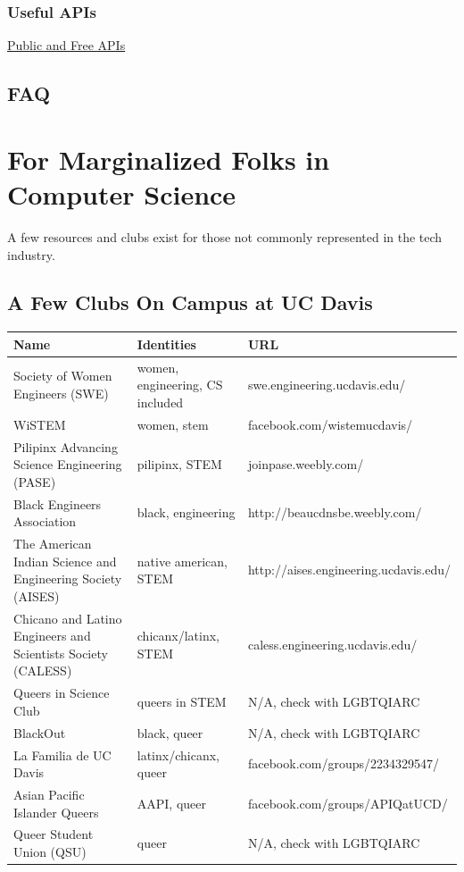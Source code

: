 \documentclass{article}
\begin{document}
\subsubsection{Useful APIs}
\href{https://github.com/toddmotto/public-apis}{Public and Free APIs}
\subsection{FAQ}
\newpage
\section {For Marginalized Folks in Computer Science}
\hspace{0.5cm} A few resources and clubs exist for those not commonly represented in the tech industry. 

\subsection{A Few Clubs On Campus at UC Davis}
\begin{tabular}{|p{5cm}|l|p{7cm}|}
\hline
\textbf{Name} & \textbf{Identities} & \textbf{URL} \\
\hline
Society of Women Engineers (SWE) & women, engineering, CS included & swe.engineering.ucdavis.edu/ \\
\hline
WiSTEM & women, stem & facebook.com/wistemucdavis/ \\
\hline
Pilipinx Advancing Science Engineering (PASE) & pilipinx, STEM & joinpase.weebly.com/ \\
\hline
Black Engineers Association & black, engineering & http://beaucdnsbe.weebly.com/ \\
\hline
The American Indian Science and Engineering Society (AISES) & native american, STEM & http://aises.engineering.ucdavis.edu/ \\
\hline
Chicano and Latino Engineers and Scientists Society (CALESS) & chicanx/latinx, STEM & caless.engineering.ucdavis.edu/ \\
\hline
Queers in Science Club & queers in STEM & N/A, check with LGBTQIARC\\
\hline
BlackOut & black, queer & N/A, check with LGBTQIARC \\
\hline
La Familia de UC Davis & latinx/chicanx, queer & facebook.com/groups/2234329547/ \\
\hline
Asian Pacific Islander Queers & AAPI, queer & facebook.com/groups/APIQatUCD/ \\
\hline
Queer Student Union (QSU) & queer & N/A, check with LGBTQIARC \\
\hline
\end{tabular}
\end{document}
